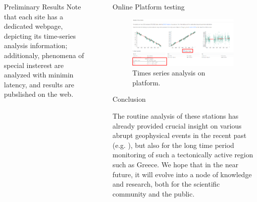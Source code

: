 \documentclass[final,a0,portrait]{beamer}
\newlength{\sepwid}
\newlength{\onecolwid}
\begin{document}
\begin{frame}[t]
\begin{columns}[t]
\begin{column}{\onecolwid}
\begin{block}{Preliminary Results}
{Note that each site has a dedicated webpage, depicting its time-series analysis information; additionaly, 
phenomena of special insterest are analyzed with minimin latency, and results are pubslished on the web.
}
\end{block}


\end{column} %

\begin{column}{\sepwid}\end{column} %


\begin{column}{\onecolwid} %


\begin{block}{Online Platform}
testing

\begin{figure}
    \includegraphics[width=1\onecolwid]{gsg2022_ts1.png}
    \caption{Times series analysis on platform.}
    \label{fig:vels}
\end{figure}

\end{block}



\begin{block}{Conclusion}
{\small
The routine analysis of these stations has already provided crucial insight on various abrupt geophysical events in the recent past (e.g. \cite{GRL:GRL50066}),
but also for the long time period  monitoring of such a tectonically active region such as Greece.
We hope that in the near future, it will evolve into a node of knowledge and research, 
both for the scientific community and the public.

}
\end{block}
\end{column}
\end{columns}
\end{frame}
\end{document}
